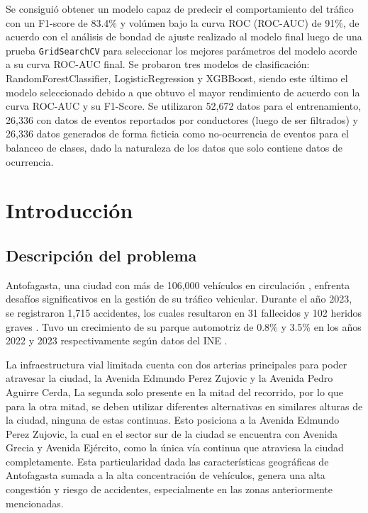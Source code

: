 \documentclass[12pt]{article}
\begin{document}
Se consiguió obtener un modelo capaz de predecir el comportamiento del tráfico con un F1-score de 83.4\% y volúmen bajo la curva ROC (ROC-AUC) de 91\%, de acuerdo con el análisis de bondad de ajuste realizado al modelo final luego de una prueba \texttt{GridSearchCV} para seleccionar los mejores parámetros del modelo acorde a su curva ROC-AUC final. Se probaron tres modelos de clasificación: RandomForestClassifier, LogisticRegression y XGBBoost, siendo este último el modelo seleccionado debido a que obtuvo el mayor rendimiento de acuerdo con la curva ROC-AUC y su F1-Score. Se utilizaron 52,672 datos para el entrenamiento, 26,336 con datos de eventos reportados por conductores (luego de ser filtrados) y 26,336 datos generados de forma ficticia como no-ocurrencia de eventos para el balanceo de clases, dado la naturaleza de los datos que solo contiene datos de ocurrencia.

\section{Introducción}
\subsection{Descripción del problema}

Antofagasta, una ciudad con más de 106,000 vehículos en circulación \citep{comision2023}, enfrenta desafíos significativos en la gestión de su tráfico vehicular. Durante el año 2023, se registraron 1,715 accidentes, los cuales resultaron en 31 fallecidos y 102 heridos graves \citep{comision2023}. Tuvo un crecimiento de su parque automotriz de 0.8\% y 3.5\% en los años 2022 y 2023 respectivamente según datos del INE \citep{ine2023}.

La infraestructura vial limitada cuenta con dos arterias principales para poder atravesar la ciudad, la Avenida Edmundo Perez Zujovic y la Avenida Pedro Aguirre Cerda, La segunda solo presente en la mitad del recorrido, por lo que para la otra mitad, se deben utilizar diferentes alternativas en similares alturas de la ciudad, ninguna de estas continuas. Esto posiciona a la Avenida Edmundo Perez Zujovic, la cual en el sector sur de la ciudad se encuentra con Avenida Grecia y Avenida Ejército, como la única vía continua que atraviesa la ciudad completamente. Esta particularidad dada las características geográficas de Antofagasta sumada a la alta concentración de vehículos, genera una alta congestión y  riesgo de accidentes, especialmente en las zonas anteriormente mencionadas.
\end{document}

